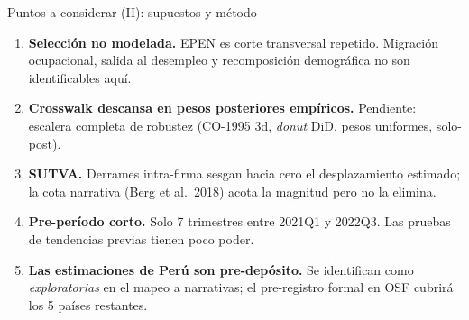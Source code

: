 \documentclass[aspectratio=169,11pt]{beamer}
\newcommand{\cit}[1]{\textcolor{pgray}{\small(#1)}}
\begin{document}
\begin{frame}{Puntos a considerar (II): supuestos y método}
\footnotesize
\vspace{0.2em}
\begin{enumerate}\setlength\itemsep{0.35em}
  \setcounter{enumi}{4}
  \item \textbf{Selección no modelada.} EPEN es corte transversal repetido. Migración ocupacional, salida al desempleo y recomposición demográfica no son identificables aquí.
  \item \textbf{Crosswalk descansa en pesos posteriores empíricos.} Pendiente: escalera completa de robustez (CO-1995 3d, \emph{donut} DiD, pesos uniformes, solo-post).
  \item \textbf{SUTVA.} Derrames intra-firma sesgan hacia cero el desplazamiento estimado; la cota narrativa \cit{Berg et al.\ 2018} acota la magnitud pero no la elimina.
  \item \textbf{Pre-período corto.} Solo 7 trimestres entre 2021Q1 y 2022Q3. Las pruebas de tendencias previas tienen poco poder.
  \item \textbf{Las estimaciones de Perú son pre-depósito.} Se identifican como \emph{exploratorias} en el mapeo a narrativas; el pre-registro formal en OSF cubrirá los 5 países restantes.
\end{enumerate}
\end{frame}
\end{document}
